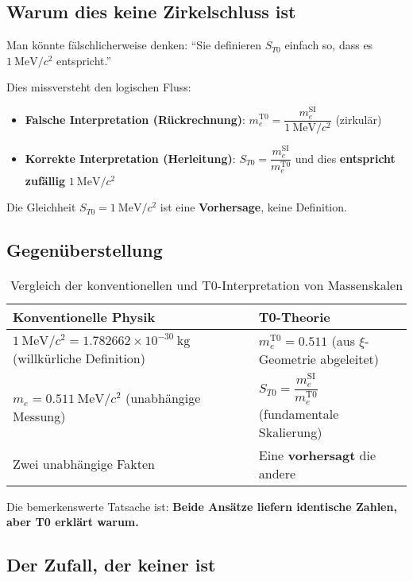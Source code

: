 \documentclass[12pt,a4paper]{article}
\begin{document}
	\subsection{Warum dies keine Zirkelschluss ist}
	
	Man könnte fälschlicherweise denken: ``Sie definieren $S_{T0}$ einfach so, dass es $1~\mathrm{MeV}/c^2$ entspricht.''
	
	Dies missversteht den logischen Fluss:
	
	\begin{itemize}
		\item \textbf{Falsche Interpretation (Rückrechnung)}: 
		$m_e^{\mathrm{T0}} = \dfrac{m_e^{\mathrm{SI}}}{1~\mathrm{MeV}/c^2}$ (zirkulär)
		
		\item \textbf{Korrekte Interpretation (Herleitung)}: 
		$S_{T0} = \dfrac{m_e^{\mathrm{SI}}}{m_e^{\mathrm{T0}}}$ und dies \textbf{entspricht zufällig} $1~\mathrm{MeV}/c^2$
	\end{itemize}
	
	Die Gleichheit $S_{T0} = 1~\mathrm{MeV}/c^2$ ist eine \textbf{Vorhersage}, keine Definition.
	
	\subsection{Gegenüberstellung}
	
	\begin{table}[h]
		\centering
		\begin{tabular}{p{6cm}p{6cm}}
			\toprule
			\textbf{Konventionelle Physik} & \textbf{T0-Theorie} \\
			\midrule
			$1~\mathrm{MeV}/c^2 = 1.782662\times 10^{-30}~\mathrm{kg}$ (willkürliche Definition) & $m_e^{\mathrm{T0}} = 0.511$ (aus $\xi$-Geometrie abgeleitet) \\
			$m_e = 0.511~\mathrm{MeV}/c^2$ (unabhängige Messung) & $S_{T0} = \dfrac{m_e^{\mathrm{SI}}}{m_e^{\mathrm{T0}}}$ (fundamentale Skalierung) \\
			Zwei unabhängige Fakten & Eine \textbf{vorhersagt} die andere \\
			\bottomrule
		\end{tabular}
		\caption{Vergleich der konventionellen und T0-Interpretation von Massenskalen}
	\end{table}
	
	Die bemerkenswerte Tatsache ist: \textbf{Beide Ansätze liefern identische Zahlen, aber T0 erklärt warum.}
	
	\subsection{Der Zufall, der keiner ist}
	
\end{document}
